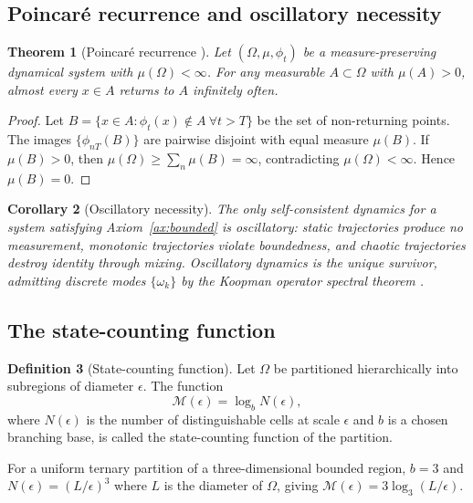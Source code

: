 \documentclass[11pt,twocolumn,a4paper]{article}
\newtheorem{theorem}{Theorem}[section]
\newtheorem{corollary}[theorem]{Corollary}
\theoremstyle{definition}
\newtheorem{definition}[theorem]{Definition}
\theoremstyle{remark}
\newcommand{\Mop}{\mathcal{M}}
\begin{document}
\subsection{Poincar\'e recurrence and oscillatory necessity}

\begin{theorem}[Poincar\'e recurrence \citep{poincare1890}]\label{thm:poincare}
Let $(\Omega, \mu, \phi_t)$ be a measure-preserving dynamical system with $\mu(\Omega) < \infty$. For any measurable $A \subset \Omega$ with $\mu(A) > 0$, almost every $x \in A$ returns to $A$ infinitely often.
\end{theorem}

\begin{proof}
Let $B = \{x \in A : \phi_t(x) \notin A~\forall t > T\}$ be the set of non-returning points. The images $\{\phi_{nT}(B)\}$ are pairwise disjoint with equal measure $\mu(B)$. If $\mu(B) > 0$, then $\mu(\Omega) \geq \sum_n \mu(B) = \infty$, contradicting $\mu(\Omega) < \infty$. Hence $\mu(B) = 0$.
\end{proof}

\begin{corollary}[Oscillatory necessity]\label{cor:osc}
The only self-consistent dynamics for a system satisfying Axiom~\ref{ax:bounded} is oscillatory: static trajectories produce no measurement, monotonic trajectories violate boundedness, and chaotic trajectories destroy identity through mixing. Oscillatory dynamics is the unique survivor, admitting discrete modes $\{\omega_k\}$ by the Koopman operator spectral theorem \citep{koopman1931,mezic2005}.
\end{corollary}

\subsection{The state-counting function}

\begin{definition}[State-counting function]\label{def:M}
Let $\Omega$ be partitioned hierarchically into subregions of diameter $\epsilon$. The function
\begin{equation}
\Mop(\epsilon) = \log_b N(\epsilon),
\end{equation}
where $N(\epsilon)$ is the number of distinguishable cells at scale $\epsilon$ and $b$ is a chosen branching base, is called the state-counting function of the partition.
\end{definition}

For a uniform ternary partition of a three-dimensional bounded region, $b = 3$ and $N(\epsilon) = (L/\epsilon)^3$ where $L$ is the diameter of $\Omega$, giving $\Mop(\epsilon) = 3\log_3(L/\epsilon)$.
\end{document}
